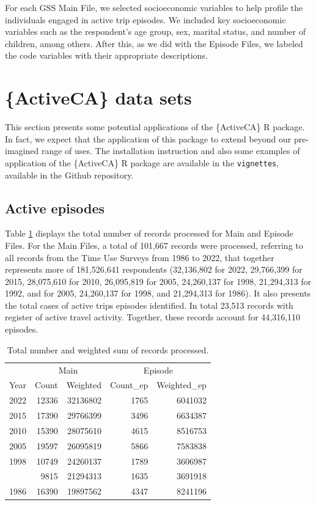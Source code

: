 \documentclass[Royal,times,sageh]{sagej}
\begin{document}
For each GSS Main File, we selected socioeconomic variables to help
profile the individuals engaged in active trip episodes. We included key
socioeconomic variables such as the respondent's age group, sex, marital
status, and number of children, among others. After this, as we did with
the Episode Files, we labeled the code variables with their appropriate
descriptions.

\section{\{ActiveCA\} data sets}\label{activeca-data-sets}

This section presents some potential applications of the \{ActiveCA\} R
package. In fact, we expect that the application of this package to
extend beyond our pre-imagined range of uses. The installation
instruction and also some examples of application of the \{ActiveCA\} R
package are available in the \texttt{vignettes}, available in the Github
repository.

\subsection{Active episodes}\label{active-episodes}

Table \ref{tab:processed-obs} displays the total number of records
processed for Main and Episode Files. For the Main Files, a total of
101,667 records were processed, referring to all records from the Time
Use Surveys from 1986 to 2022, that together represents more of
181,526,641 respondents (32,136,802 for 2022, 29,766,399 for 2015,
28,075,610 for 2010, 26,095,819 for 2005, 24,260,137 for 1998,
21,294,313 for 1992, and for 2005, 24,260,137 for 1998, and 21,294,313
for 1986). It also presents the total cases of active trips episodes
identified. In total 23,513 records with register of active travel
activity. Together, these records account for 44,316,110 episodes.

\begingroup\fontsize{8}{10}\selectfont

\begin{longtable}[t]{rr>{}r|rr}
\caption{\label{tab:table_df_processed}\label{tab:processed-obs}Total number and weighted sum of records processed.}\\
\toprule
\multicolumn{1}{c}{ } & \multicolumn{2}{c}{Main} & \multicolumn{2}{c}{Episode} \\
\cmidrule(l{3pt}r{3pt}){2-3} \cmidrule(l{3pt}r{3pt}){4-5}
Year & Count & Weighted & Count\_ep & Weighted\_ep\\
\midrule
2022 & 12336 & 32136802 & 1765 & 6041032\\
2015 & 17390 & 29766399 & 3496 & 6634387\\
2010 & 15390 & 28075610 & 4615 & 8516753\\
2005 & 19597 & 26095819 & 5866 & 7583838\\
1998 & 10749 & 24260137 & 1789 & 3606987\\
\addlinespace
1992 & 9815 & 21294313 & 1635 & 3691918\\
1986 & 16390 & 19897562 & 4347 & 8241196\\
\bottomrule
\end{longtable}
\endgroup{}
\end{document}
